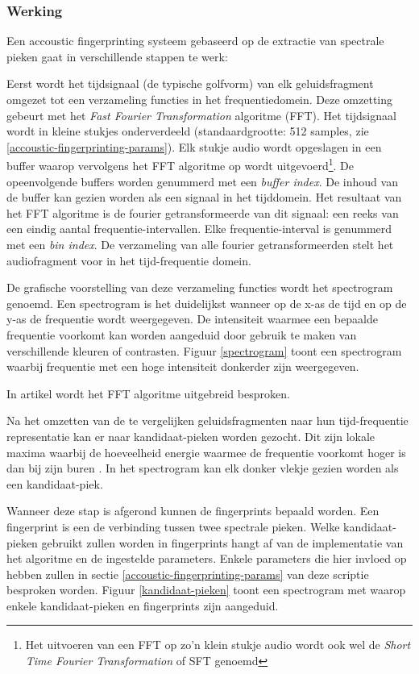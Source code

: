 \subsubsection{Werking}

Een accoustic fingerprinting systeem gebaseerd op de extractie van spectrale pieken gaat in verschillende stappen te werk: 

Eerst wordt het tijdsignaal (de typische golfvorm) van elk geluidsfragment omgezet tot een verzameling functies in het frequentiedomein. Deze omzetting gebeurt met het \textit{Fast Fourier Transformation} algoritme (FFT). Het tijdsignaal wordt in kleine stukjes onderverdeeld (standaardgrootte: 512 samples, zie \ref{accoustic-fingerprinting-params}). Elk stukje audio wordt opgeslagen in een buffer waarop vervolgens het FFT algoritme op wordt uitgevoerd\footnote{Het uitvoeren van een FFT op zo'n klein stukje audio wordt ook wel de \textit{Short Time Fourier Transformation} of SFT genoemd}. De opeenvolgende buffers worden genummerd met een \textit{buffer index}. De inhoud van de buffer kan gezien worden als een signaal in het tijddomein. Het resultaat van het FFT algoritme is de fourier getransformeerde van dit signaal: een reeks van een eindig aantal frequentie-intervallen. Elke frequentie-interval is genummerd met een \textit{bin index}. De verzameling van alle fourier getransformeerden stelt het audiofragment voor in het tijd-frequentie domein. %

De grafische voorstelling van deze verzameling functies wordt het spectrogram genoemd. Een spectrogram is het duidelijkst wanneer op de x-as de tijd en op de y-as de frequentie wordt weergegeven. De intensiteit waarmee een bepaalde frequentie voorkomt kan worden aangeduid door gebruik te maken van verschillende kleuren of contrasten. Figuur \ref{spectrogram} toont een spectrogram waarbij frequentie met een hoge intensiteit donkerder zijn weergegeven.

In artikel \cite{oppenheim1970speech} wordt het FFT algoritme uitgebreid besproken.

Na het omzetten van de te vergelijken geluidsfragmenten naar hun tijd-frequentie representatie kan er naar kandidaat-pieken worden gezocht. Dit zijn lokale maxima waarbij de hoeveelheid energie waarmee de frequentie voorkomt hoger is dan bij zijn buren \cite{six2014panako}. In het spectrogram kan elk donker vlekje gezien worden als een kandidaat-piek.

Wanneer deze stap is afgerond kunnen de fingerprints bepaald worden. Een fingerprint is een de verbinding tussen twee spectrale pieken. Welke kandidaat-pieken gebruikt zullen worden in fingerprints hangt af van de implementatie van het algoritme en de ingestelde parameters. Enkele parameters die hier invloed op hebben zullen in sectie \ref{accoustic-fingerprinting-params} van deze scriptie besproken worden. Figuur \ref{kandidaat-pieken} toont een spectrogram met waarop enkele kandidaat-pieken en fingerprints zijn aangeduid.

